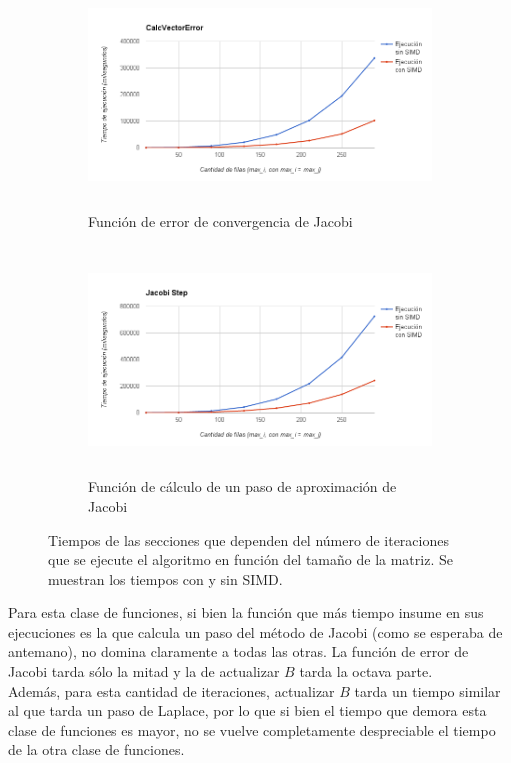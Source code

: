 \documentclass[a4paper]{article}
\begin{document}
\begin{figure}[!htbp]
\begin{subfigure}{.5\textwidth}
  \centering
	\hspace{-1.5cm}\includegraphics[height=6cm, width=\linewidth]{images/JacobiError.png}
  \caption{Función de error de convergencia de Jacobi}
  \label{fig:JacobiError}
\end{subfigure}%
\begin{subfigure}{.5\textwidth}
  \centering
	\includegraphics[height=6cm, width=\linewidth]{images/JacobiStep.png}
  \caption{Función de cálculo de un paso de aproximación de Jacobi}
  \label{fig:JacobiStep}
\end{subfigure}

\caption{Tiempos de las secciones que dependen del número de iteraciones que se ejecute el algoritmo en función del tamaño de la matriz. Se muestran los tiempos con y sin SIMD.}
 \label{fig:multiplesIter} 
\end{figure}

Para esta clase de funciones, si bien la función que más tiempo 
insume en sus ejecuciones es la que calcula un paso del método de 
Jacobi (como se esperaba de antemano), no domina claramente a todas 
las otras. La función de error de Jacobi tarda sólo la mitad y la 
de actualizar $B$ tarda la octava parte.\\
Además, para esta cantidad de iteraciones, actualizar $B$ tarda un 
tiempo similar al que tarda un paso de Laplace, por lo que si bien 
el tiempo que demora esta clase de funciones es mayor, no se vuelve 
completamente despreciable el tiempo de la otra clase de funciones.\\
\bigskip
\end{document}
